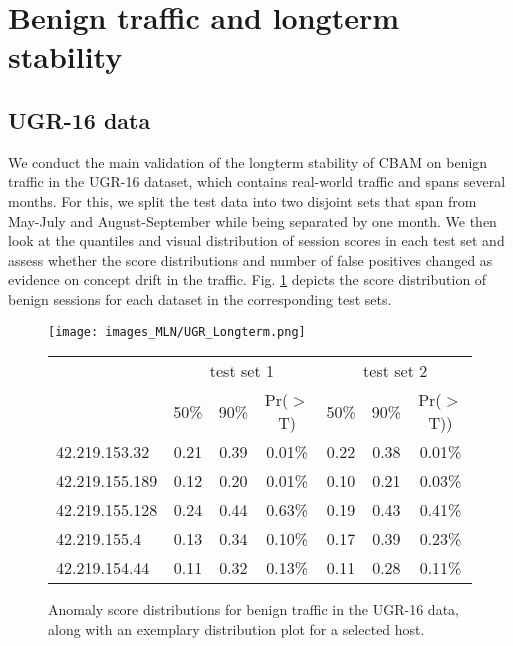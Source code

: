 \section{Benign traffic and longterm stability}\label{SecF:Benigntraffic}

\subsection{UGR-16 data}\label{SecF:UGR_benign}


We conduct the main validation of the longterm stability of CBAM on benign traffic in the UGR-16 dataset, which contains real-world traffic and spans several months. For this, we split the test data into two disjoint sets that span from May-July and August-September while being separated by one month.
We then look at the quantiles and visual distribution of session scores in each test set and assess whether the score distributions and number of false positives changed as evidence on concept drift in the traffic.
Fig. \ref{figF:UGRrealresults} depicts the score distribution of benign sessions for each dataset in the corresponding test sets. 




\begin{figure}
    \begin{center}
\texttt{[image: images\_MLN/UGR\_Longterm.png]} 


\begin{tabular}{l|ccc|ccc}
  \hline
&\multicolumn{3}{c|}{test set 1}&\multicolumn{3}{c}{test set 2}\\
 &  50\%  &  90\%  &  Pr($>$T)  &  50\%  &  90\%  &  Pr($>$T)) \\ 
  \hline
42.219.153.32 & 0.21 & 0.39   & 0.01\% & 0.22 & 0.38   & 0.01\% \\ 
  42.219.155.189 & 0.12 & 0.20  & 0.01\% &0.10 & 0.21  & 0.03\% \\ 
  42.219.155.128 & 0.24 & 0.44   & 0.63\% & 0.19 & 0.43   & 0.41\% \\ 
  42.219.155.4 & 0.13 & 0.34 & 0.10\% & 0.17 & 0.39 & 0.23\% \\ 
  42.219.154.44 & 0.11 & 0.32 & 0.13\% & 0.11 & 0.28 & 0.11\% \\ 
   \hline
\end{tabular}


\end{center}
\caption{Anomaly score distributions for benign traffic in the UGR-16 data, along with an exemplary distribution plot for a selected host.}\label{figF:UGRrealresults}
\end{figure}

